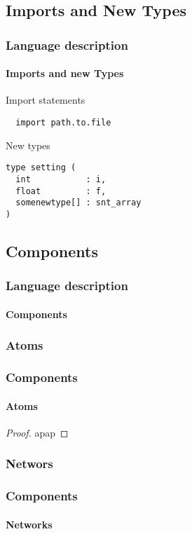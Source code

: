 \documentclass[10pt]{beamer}
\begin{document}
\subsection*{Imports and New Types}
\begin{frame}[fragile]
\frametitle{Language description}
\framesubtitle{Imports and new Types}
\pause

\begin{block}{Import statements}
\begin{verbatim}
  import path.to.file
\end{verbatim}
\end{block}
\pause

\begin{block}{New types}
\begin{verbatim}
type setting (
  int           : i,
  float         : f,
  somenewtype[] : snt_array
)
\end{verbatim}
\end{block}
\end{frame}


\subsection*{Components}
\begin{frame}
\frametitle{Language description}
\framesubtitle{Components}

\end{frame}


\subsubsection*{Atoms}
\begin{frame}
\frametitle{Components}
\framesubtitle{Atoms}
\begin{proof}
  apap
\end{proof}
\end{frame}


\subsubsection*{Networs}
\begin{frame}
\frametitle{Components}
\framesubtitle{Networks}
\end{frame}
\end{document}
